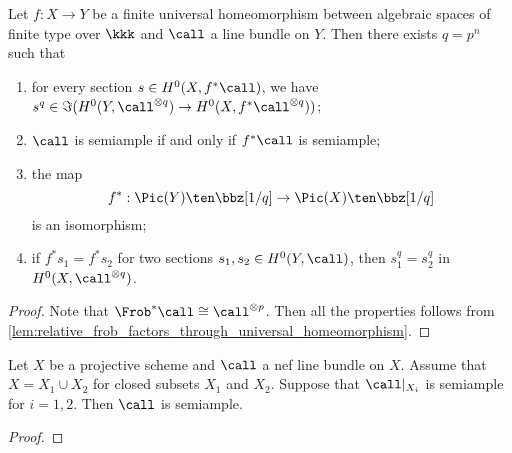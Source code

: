     \begin{proposition}\label{prop:Pic_finite_universal_homeomorphism}
        Let \(f:X \to Y\) be a finite universal homeomorphism between algebraic spaces of finite type over \(\kkk\) and \(\call\) a line bundle on \(Y\).
        Then there exists \(q=p^n\) such that 
        \begin{enumerate}
            \item for every section \(s \in H^0(X, f^*\call)\), we have \(s^q \in \Im(H^0(Y,\call^{\otimes q}) \to H^0(X, f^*\call^{\otimes q}))\);
            \item \(\call\) is semiample if and only if \(f^*\call\) is semiample;
            \item the map 
                \[ f^*: \Pic(Y) \ten \bbz[1/q] \to \Pic(X) \ten \bbz[1/q] \]
                is an isomorphism;
            \item if \(f^*s_1 = f^*s_2\) for two sections \(s_1,s_2 \in H^0(Y,\call)\), then \(s_1^q = s_2^q\) in \(H^0(X,\call^{\otimes q})\).
        \end{enumerate}
    \end{proposition}
    \begin{proof}
        Note that \(\Frob^*\call \cong \call^{\otimes p}\).
        Then all the properties follows from \cref{lem:relative_frob_factors_through_universal_homeomorphism}.
    \end{proof}

    \begin{proposition}\label{prop:semiample_for_reducible}
        Let \(X\) be a projective scheme and \(\call\) a nef line bundle on \(X\).
        Assume that \(X = X_1 \cup X_2\) for closed subsets \(X_1\) and \(X_2\).
        Suppose that \(\call|_{X_i}\) is semiample for \(i = 1,2\).
        Then \(\call\) is semiample.
    \end{proposition}
    \begin{proof}
    \end{proof}

